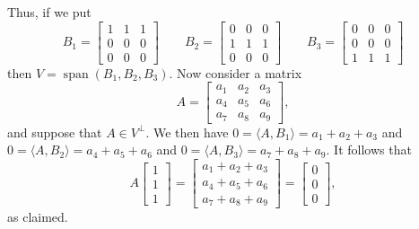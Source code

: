 \documentclass{amsart}
\newcommand{\spn}       {\operatorname{span}}
\newcommand{\bsm}       {\left[\begin{smallmatrix}}
\newcommand{\esm}       {\end{smallmatrix}\right]}
\newcommand{\ip}[1]     {\langle #1\rangle}
\renewcommand{\:}       {\colon}
\theoremstyle{definition}
\renewenvironment{solution}{\SolutionAtEnd}{\endSolutionAtEnd}
\begin{document}
\begin{solution}
\begin{itemize}
{\[   \]}
   Thus, if we put 
   {\tiny \[
       B_1 = \bsm 1&1&1\\0&0&0\\0&0&0\esm \hspace{2em}
       B_2 = \bsm 0&0&0\\1&1&1\\0&0&0\esm \hspace{2em}
       B_3 = \bsm 0&0&0\\0&0&0\\1&1&1\esm
   \]}
   then $V=\spn(B_1,B_2,B_3)$.  Now consider a matrix
   \[ A = \bsm a_1&a_2&a_3\\ a_4&a_5&a_6\\ a_7&a_8&a_9\esm, \]
   and suppose that $A\in V^\perp$.  We then have
   $0=\ip{A,B_1}=a_1+a_2+a_3$ and 
   $0=\ip{A,B_2}=a_4+a_5+a_6$ and
   $0=\ip{A,B_3}=a_7+a_8+a_9$.
   It follows that
   \[ A\bsm 1\\1\\1\esm =
       \bsm a_1+a_2+a_3\\ a_4+a_5+a_6\\ a_7+a_8+a_9\esm
        = \bsm 0\\ 0\\ 0 \esm,
   \]
   as claimed.
 \end{itemize}
\end{solution}
\end{document}

